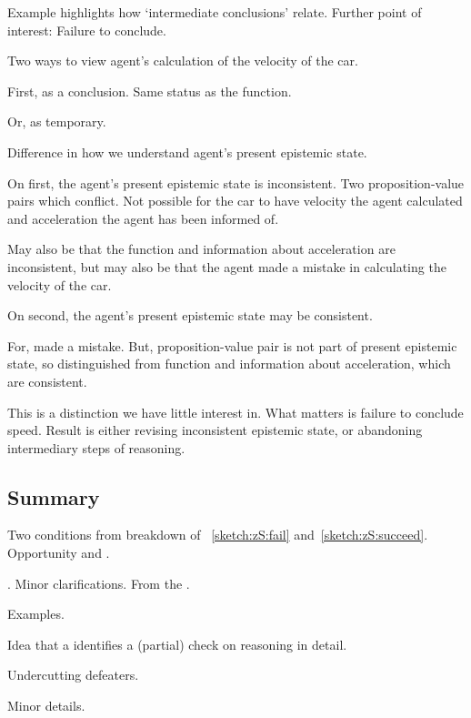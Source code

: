 \begin{note}
  Example highlights how `intermediate conclusions' relate.
  Further point of interest:
  Failure to conclude.

  Two ways to view agent's calculation of the velocity of the car.

  First, as a conclusion.
  Same status as the function.

  Or, as temporary.

  Difference in how we understand agent's present epistemic state.

  On first, the agent's present epistemic state is inconsistent.
  Two proposition-value pairs which conflict.
  Not possible for the car to have velocity the agent calculated and acceleration the agent has been informed of.

  May also be that the function and information about acceleration are inconsistent, but may also be that the agent made a mistake in calculating the velocity of the car.

  On second, the agent's present epistemic state may be consistent.

  For, made a mistake.
  But, proposition-value pair is not part of present epistemic state, so distinguished from function and information about acceleration, which are consistent.

  This is a distinction we have little interest in.
  What matters is failure to conclude speed.
  Result is either revising inconsistent epistemic state, or abandoning intermediary steps of reasoning.
\end{note}

\subsection{Summary}
\label{cha:zS:sec:curbs:summary}

\begin{note}
  Two conditions from breakdown of ~\ref{sketch:zS:fail} and~\ref{sketch:zS:succeed}.
  Opportunity and \check{}.

  \curb{}.
  Minor clarifications.
  From the \agpe{}.

  Examples.

  Idea that a \curb{} identifies a (partial) check on reasoning in detail.

  Undercutting defeaters.

  Minor details.
\end{note}

